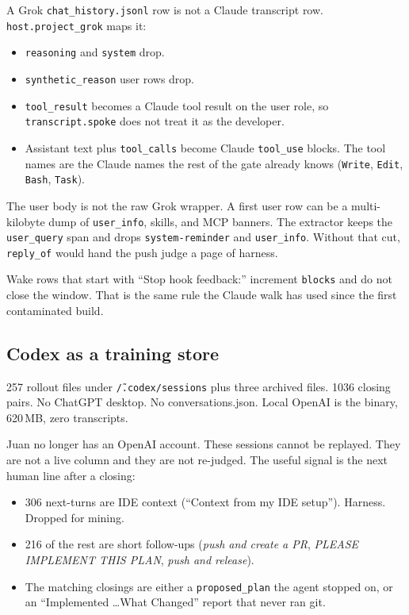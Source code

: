 A Grok \texttt{chat\_history.jsonl} row is not a Claude transcript
row. \texttt{host.project\_grok} maps it:

\begin{itemize}
\item \texttt{reasoning} and \texttt{system} drop.
\item \texttt{synthetic\_reason} user rows drop.
\item \texttt{tool\_result} becomes a Claude tool result on the user
role, so \texttt{transcript.spoke} does not treat it as the developer.
\item Assistant text plus \texttt{tool\_calls} become Claude
\texttt{tool\_use} blocks. The tool names are the Claude names the
rest of the gate already knows (\texttt{Write}, \texttt{Edit},
\texttt{Bash}, \texttt{Task}).
\end{itemize}

The user body is not the raw Grok wrapper. A first user row can be a
multi-kilobyte dump of \texttt{user\_info}, skills, and MCP banners.
The extractor keeps the \texttt{user\_query} span and drops
\texttt{system-reminder} and \texttt{user\_info}. Without that cut,
\texttt{reply\_of} would hand the push judge a page of harness.

Wake rows that start with ``Stop hook feedback:'' increment
\texttt{blocks} and do not close the window. That is the same rule
the Claude walk has used since the first contaminated build.

\subsection{Codex as a training store}
\label{app:codextrain}

257 rollout files under \texttt{\~/.codex/sessions} plus three
archived files. 1036 closing pairs. No ChatGPT desktop. No
conversations.json. Local OpenAI is the binary, 620\,MB, zero
transcripts.

Juan no longer has an OpenAI account. These sessions cannot be
replayed. They are not a live column and they are not re-judged.
The useful signal is the next human line after a closing:

\begin{itemize}
\item 306 next-turns are IDE context (``Context from my IDE setup'').
Harness. Dropped for mining.
\item 216 of the rest are short follow-ups (\emph{push and create a
PR}, \emph{PLEASE IMPLEMENT THIS PLAN}, \emph{push and release}).
\item The matching closings are either a \texttt{proposed\_plan} the
agent stopped on, or an ``Implemented \ldots What Changed'' report
that never ran git.
\end{itemize}

